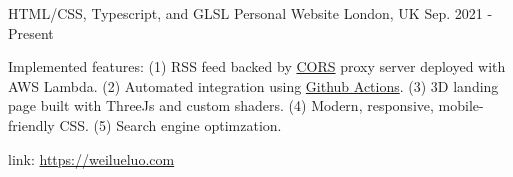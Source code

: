 

\begin{cventries}

  \cventry
    {HTML/CSS, Typescript, and GLSL} %
    {Personal Website} %
    {London, UK} %
    {Sep. 2021 - Present} %
    {
      \begin{cvitems} %
        \item {Implemented features: (1) RSS feed backed by \href{https://developer.mozilla.org/en-US/docs/Web/HTTP/CORS}{CORS} proxy server deployed with AWS Lambda. (2) Automated integration using \href{https://github.com/features/actions}{Github Actions}. (3) 3D landing page built with ThreeJs and custom shaders. (4) Modern, responsive, mobile-friendly CSS. (5) Search engine optimzation.}
        \item {link: \href{https://weilueluo.com}{https://weilueluo.com}}
      \end{cvitems}
    }



\end{cventries}
